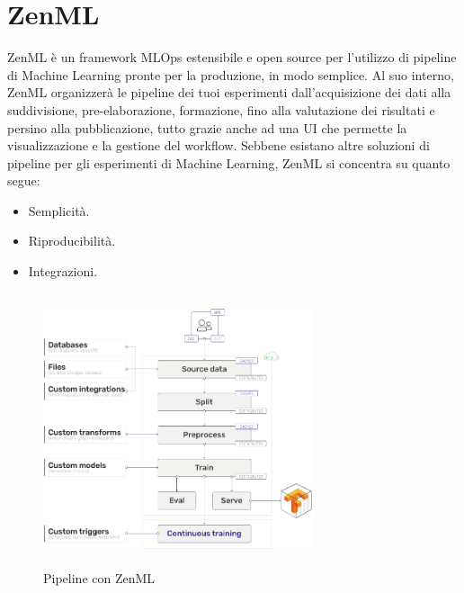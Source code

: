 \documentclass[12pt,a4paper]{report}
\begin{document}
\section{ZenML}
ZenML è un framework MLOps estensibile e open source per l'utilizzo di pipeline di Machine Learning pronte per la produzione, in modo semplice. Al suo interno, ZenML organizzerà le pipeline dei tuoi esperimenti dall'acquisizione dei dati alla suddivisione, pre-elaborazione, formazione, fino alla valutazione dei risultati e persino alla pubblicazione, tutto grazie anche ad una UI che permette la visualizzazione e la gestione del workflow.
Sebbene esistano altre soluzioni di pipeline per gli esperimenti di Machine Learning, ZenML si concentra su quanto segue:
\begin{itemize}
    \item Semplicità.
    \item Riproducibilità.
    \item Integrazioni.
\end{itemize}

\begin{figure}[h!]
    \begin{center}
        \includegraphics[width=8cm,height=8cm,keepaspectratio]{ZenML-schema}
    \end{center}
    \caption{Pipeline con ZenML}
    \label{fig:ZenML-schema}
\end{figure}
\end{document}
